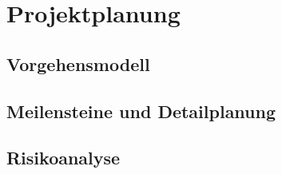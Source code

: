
\chapter{Projektplanung}

\section{Vorgehensmodell}




\section{Meilensteine und Detailplanung} \label{sec:meilen}



\section{Risikoanalyse} \label{sec:risiken}


